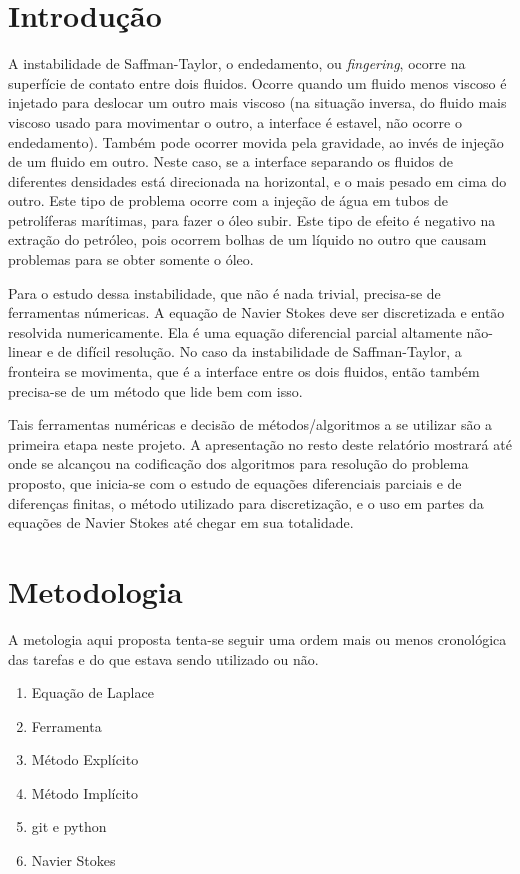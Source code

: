\documentclass[journal]{IEEEtran}
\begin{document}
\section{Introdução}
A instabilidade de Saffman-Taylor, o endedamento, ou \textit{fingering}, ocorre na superfície de contato entre dois fluidos. Ocorre quando um fluido menos viscoso é injetado para deslocar um outro mais viscoso (na situação inversa, do fluido mais viscoso usado para movimentar o outro, a interface é estavel, não ocorre o endedamento). Também pode ocorrer movida pela gravidade, ao invés de injeção de um fluido em outro. Neste caso, se a interface separando os fluidos de diferentes densidades está direcionada na horizontal, e o mais pesado em cima do outro. Este tipo de problema ocorre com a injeção de água em tubos de petrolíferas marítimas, para fazer o óleo subir. Este tipo de efeito é negativo na extração do petróleo, pois ocorrem bolhas de um líquido no outro que causam problemas para se obter somente o óleo.

Para o estudo dessa instabilidade, que não é nada trivial, precisa-se de ferramentas númericas. A equação de Navier Stokes deve ser discretizada e então resolvida numericamente. Ela é uma equação diferencial parcial altamente não-linear e de difícil resolução. No caso da instabilidade de Saffman-Taylor, a fronteira se movimenta, que é a interface entre os dois fluidos, então também precisa-se de um método que lide bem com isso. 

Tais ferramentas numéricas e decisão de métodos/algoritmos a se utilizar são a primeira etapa neste projeto. A apresentação no resto deste relatório mostrará até onde se alcançou na codificação dos algoritmos para resolução do problema proposto, que inicia-se com o estudo de equações diferenciais parciais e de diferenças finitas, o método utilizado para discretização, e o uso em partes da equações de Navier Stokes até chegar em sua totalidade.
\section{Metodologia}
A metologia aqui proposta tenta-se seguir uma ordem mais ou menos cronológica das tarefas e do que estava sendo utilizado ou não.
\begin{enumerate}
  \item Equação de Laplace
  \item Ferramenta
  \item Método Explícito
  \item Método Implícito
  \item git e python
  \item Navier Stokes
\end{enumerate}
\end{document}
